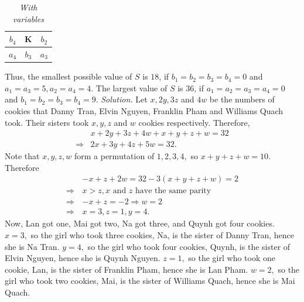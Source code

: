 \begin{multicols}{2}
\begin{table}[H]
\begin{tabular}{|c|c|c|}
			$b_4$ & K & $b_2$ \\ \hline
			$a_4$ & $b_3$ & $a_3$ \\ \hline
		\end{tabular}
		\caption{\small\textit{\color{toancuabi}With variables}}
		\vspace*{-10pt}
	\end{table}
	Thus, the smallest possible value of $S$ is $18$, if $b_1=b_2=b_3=b_4=0$ and $a_1=a_3=5,a_2=a_4=4.$
	The largest value of $S$ is $36$, if $a_1=a_2=a_3=a_4=0$ and $b_1=b_2=b_3=b_4=9.$
	\vskip 0.2cm
	\vskip 0.2cm
	\textit{Solution.}
	Let $x, 2y, 3z$ and $4w$ be the numbers of cookies that 
	Danny Tran, Elvin Nguyen, Franklin Pham and Williams Quach took.
	Their sisters took $x, y, z$ and $w$ cookies respectively. Therefore,
	\begin{align*}
		&x + 2y + 3z + 4w + x + y + z + w = 32\\
		\Rightarrow &2x + 3y + 4z + 5w = 32.
	\end{align*}
	Note that $x, y, z, w$ form a permutation of $1,2,3,4,$ so $x + y + z + w = 10.$
	Therefore
	\begin{align*}
		&-x + z + 2w \!=\! 32-3(x + y + z + w) \!=\! 2 \\
		\Rightarrow \,&x > z, x \text{\ and\ } z \text{\ have the same parity}\\
		\Rightarrow\,&-x+z=-2 \Rightarrow  w=2 \\
		\Rightarrow \,&x=3, z=1, y=4. 
	\end{align*}
	Now, Lan got one, Mai got two, Na got three, and Quynh got four cookies.
	\vskip 0.1cm
	$x=3,$ so the girl who took three cookies, Na, is the sister of Danny Tran, hence she is Na Tran.
	\vskip 0.1cm
	$y=4,$ so the girl who took four cookies, Quynh, is the sister of Elvin Nguyen, hence she is Quynh Nguyen.
	\vskip 0.1cm
	$z=1,$ so the girl who took one cookie, Lan, is the sister of Franklin Pham, hence she is Lan Pham.
	\vskip 0.1cm
	$w=2,$ so the girl who took two cookies, Mai, is the sister of Williams Quach, hence she is Mai Quach.
	\vskip 0.1cm

\end{multicols}
